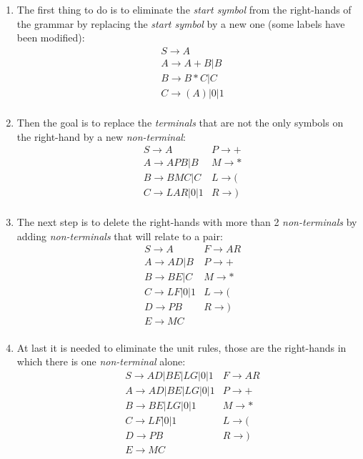 \begin{enumerate}
    \item The first thing to do is to eliminate the \textit{start symbol} from the right-hands of the grammar by replacing the \textit{start symbol} by a new one (some labels have been modified):
        \begin{align*} 
        &S \to A\\
        &A \to A+B|B\\
        &B \to B*C|C\\
        &C \to (A)|0|1\\
        \end{align*}

    \item Then the goal is to replace the \textit{terminals} that are not the only symbols on the right-hand by a new \textit{non-terminal}:
        \begin{align*} 
        &S \to A        &P \to +\\
        &A \to APB|B    &M \to *\\
        &B \to BMC|C    &L \to (\\
        &C \to LAR|0|1  &R \to )\\
        \end{align*}
    
    \item The next step is to delete the right-hands with more than 2 \textit{non-terminals} by adding \textit{non-terminals} that will relate to a pair:
        \begin{align*} 
        &S \to A        &F \to AR\\
        &A \to AD|B     &P \to +\\
        &B \to BE|C     &M \to *\\
        &C \to LF|0|1   &L \to (\\
        &D \to PB       &R \to )\\
        &E \to MC\\
        \end{align*}

    \item At last it is needed to eliminate the unit rules, those are the right-hands in which there is one \textit{non-terminal} alone:
        \begin{align*} 
        &S \to AD|BE|LG|0|1 &F \to AR\\
        &A \to AD|BE|LG|0|1 &P \to +\\
        &B \to BE|LG|0|1    &M \to *\\
        &C \to LF|0|1       &L \to (\\
        &D \to PB           &R \to )\\
        &E \to MC\\
        \end{align*}

\end{enumerate}

